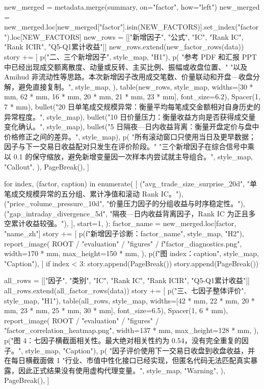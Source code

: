\documentclass[UTF8,a4paper,fontset=fandol]{ctexart}
\begin{document}
\begin{ProjectCode}
    new_merged = metadata.merge(summary, on="factor", how="left")
    new_merged = new_merged.loc[new_merged["factor"].isin(NEW_FACTORS)].set_index("factor").loc[NEW_FACTORS]
    new_rows = [["新增因子", "公式", "IC", "Rank IC", "Rank ICIR", "Q5-Q1累计收益"]]
    new_rows.extend(new_factor_rows(data))
    story += [
        p("二、三个新增因子", style_map, "H1"),
        p(
            "参考 PDF 和汇报 PPT 中已经出现成交额离散度、动量或反转、主买比例、振幅或收盘位置、"
            "以及 Amihud 非流动性等思路。本次新增因子改用成交笔数、价量联动和开盘—收盘分解，避免直接复制。",
            style_map,
        ),
        table(new_rows, style_map, widths=[30 * mm, 62 * mm, 16 * mm, 20 * mm, 21 * mm, 23 * mm], font_size=6.2),
        Spacer(1, 7 * mm),
        bullet("20 日单笔成交规模异常：衡量平均每笔成交金额相对自身历史的异常程度。", style_map),
        bullet("10 日价量压力：衡量收益方向是否获得成交量变化确认。", style_map),
        bullet("5 日隔夜—日内收益背离：衡量开盘定价与盘中价格修正之间的差异。", style_map),
        p(
            "所有滚动窗口只使用当日及更早数据；因子与下一交易日收益配对只发生在评价阶段。"
            "三个新增因子在综合信号中乘以 0.1 的保守缩放，避免新增变量因一次样本内尝试就主导组合。",
            style_map,
            "Callout",
        ),
        PageBreak(),
    ]

    for index, (factor, caption) in enumerate(
        [
            ("avg_trade_size_surprise_20d", "单笔成交规模异常的五分组、累计净值和滚动 Rank IC。"),
            ("price_volume_pressure_10d", "价量压力因子的分组收益与时序稳定性。"),
            ("gap_intraday_divergence_5d", "隔夜—日内收益背离因子，Rank IC 为正且多空累计收益较强。"),
        ],
        start=1,
    ):
        factor_name = new_merged.loc[factor, "name_zh"]
        story += [
            p(f"新增因子诊断：{factor_name}", style_map, "H2"),
            report_image(
                ROOT / "evaluation" / "figures" / f"{factor}_diagnostics.png",
                width=170 * mm,
                max_height=150 * mm,
            ),
            p(f"图 {index}：{caption}", style_map, "Caption"),
        ]
        if index < 3:
            story.append(PageBreak())
    story.append(PageBreak())

    all_rows = [["因子", "类别", "IC", "Rank IC", "Rank ICIR", "Q5-Q1累计收益"]]
    all_rows.extend(all_factor_rows(data))
    story += [
        p("三、七因子整体评价", style_map, "H1"),
        table(all_rows, style_map, widths=[42 * mm, 22 * mm, 20 * mm, 23 * mm, 25 * mm, 30 * mm], font_size=6.5),
        Spacer(1, 6 * mm),
        report_image(
            ROOT / "evaluation" / "figures" / "factor_correlation_heatmap.png",
            width=137 * mm,
            max_height=128 * mm,
        ),
        p("图 4：七因子横截面相关性。最大绝对相关性约为 0.54，没有完全重复的因子。", style_map, "Caption"),
        p(
            "因子评价使用下一交易日收盘到收盘收益，并在每日横截面做 1%
            "行业、市值中性化接口已经实现，但匿名代码无法匹配真实暴露，因此正式结果没有使用虚构代理变量。",
            style_map,
            "Warning",
        ),
        PageBreak(),
    ]


\end{ProjectCode}
\end{document}
